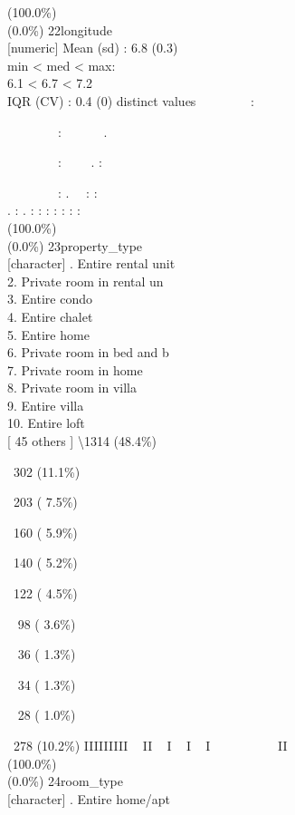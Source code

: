 \documentclass[
  journal,
]{IEEEtran}%
\begin{document}
(100.0\%) \\
(0.0\%) \textbar{} \textbar{} 22\textbar longitude\\
{[}numeric{]} \textbar Mean (sd) : 6.8 (0.3)\\
min \textless{} med \textless{} max:\\
6.1 \textless{} 6.7 \textless{} 7.2\\
IQR (CV) : 0.4 (0)  distinct values \textbar{}
\textbar~~~~~~~~:\\
\strut ~~~~~~~~: ~~~~~~.\\
\strut ~~~~~~~~: ~~~~. :\\
\strut ~~~~~~~~: . ~~: :\\
. : . : : : : : : : \\
(100.0\%) \\
(0.0\%) \textbar{} \textbar{} 23\textbar property\_type\\
{[}character{]} . Entire rental unit\\
2. Private room in rental un\\
3. Entire condo\\
4. Entire chalet\\
5. Entire home\\
6. Private room in bed and b\\
7. Private room in home\\
8. Private room in villa\\
9. Entire villa\\
10. Entire loft\\
{[} 45 others {]} \textbar\textbackslash1314 (48.4\%)\\
\strut ~302 (11.1\%)\\
\strut ~203 ( 7.5\%)\\
\strut ~160 ( 5.9\%)\\
\strut ~140 ( 5.2\%)\\
\strut ~122 ( 4.5\%)\\
\strut ~ 98 ( 3.6\%)\\
\strut ~ 36 ( 1.3\%)\\
\strut ~ 34 ( 1.3\%)\\
\strut ~ 28 ( 1.0\%)\\
\strut ~278 (10.2\%) \textbar{} \textbar IIIIIIIII ~ II ~ I ~ I ~ I ~ ~
~ ~ ~ ~ II \\
(100.0\%) \\
(0.0\%) \textbar{} \textbar{} 24\textbar room\_type\\
{[}character{]} . Entire home/apt\\
\end{document}
